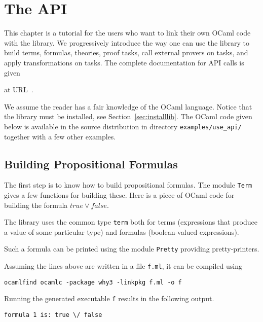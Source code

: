 \chapter{The \why API}
\label{chap:api}

This chapter is a tutorial for the users who want to link their own
OCaml code with the \why library. We progressively introduce the way
one can use the library to build terms, formulas, theories, proof
tasks, call external provers on tasks, and apply transformations on
tasks. The complete documentation for API calls is given\begin{latexonly}
at URL~\urlapi{}.\end{latexonly}

We assume the reader has a fair knowledge of the OCaml
language. Notice that the \why library must be installed, see
Section~\ref{sec:installlib}. The OCaml code given below is available in
the source distribution in directory \verb|examples/use_api/| together
with a few other examples.


\section{Building Propositional Formulas}

The first step is to know how to build propositional formulas. The
module \texttt{Term} gives a few functions for building these. Here is
a piece of OCaml code for building the formula $\mathit{true} \lor
\mathit{false}$.

The library uses the common type \texttt{term} both for terms
(\ie expressions that produce a value of some particular type)
and formulas (\ie boolean-valued expressions).

Such a formula can be printed using the module \texttt{Pretty}
providing pretty-printers.


Assuming the lines above are written in a file \texttt{f.ml}, it can
be compiled using
\begin{verbatim}
ocamlfind ocamlc -package why3 -linkpkg f.ml -o f
\end{verbatim}
Running the generated executable \texttt{f} results in the following output.
\begin{verbatim}
formula 1 is: true \/ false
\end{verbatim}


